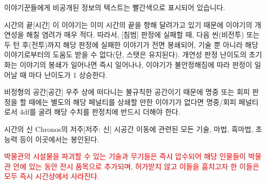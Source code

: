 \documentclass{report}
\begin{document}
	이야기꾼들에게 비공개된 정보의 텍스트는 빨간색으로 표시되어 있습니다.
	
	\begin{spoiler}{시간의 끝}{[시간]}
		이 이야기는 이미 시간의 끝을 향해 달려가고 있기 때문에 이야기의 개연성을 해칠 염려가 매우 적다. 따라서, [침범] 판정에 실패할 때, 다음 씬(비전투) 또는 두 턴 후(전투)까지 해당 판정에 실패한 이야기가 전면 봉쇄되어, 기술 뿐 아니라 해당 이야기로부터의 도움도 받을 수 없다(단, 스탯은 유지된다). 개연성 판정 난이도의 초기화는 이야기의 봉쇄가 일어나면 즉시 일어나나, 이야기가 불안정해짐에 따라 판정이 일어날 때 마다 난이도가 1 상승한다.
	\end{spoiler}
	
	\begin{spoiler}{비정형의 공간}{[공간]}
		우주 상에 떠다니는 불규칙한 공간이기 때문에 명중 또는 회피 판정을 할 때에는 별도의 해당 페널티를 상쇄할 만한 이야기가 없다면 명중/회피 페널티로서 4df를 굴려 해당 수치를 판정치에 반드시 더해야 한다.
	\end{spoiler}
	
	\begin{spoiler}{시간의 신 Chronos의 저주}{[저주: 신]}
		시공간 이동에 관련된 모든 기술, 마법, 흑마법, 초능력 등이 이곳에서는 봉인된다.
		
		\textcolor{Red}{박물관의 시설물을 파괴할 수 있는 기술과 무기들은 즉시 압수되어 해당 인물들이 박물관 안에 있는 동안 전시 품목으로 추가되며, 허가받지 않고 이들을 훔치고자 한 이들은 모두 즉시 시간상에서 사라진다.}
	\end{spoiler}
\end{document}
